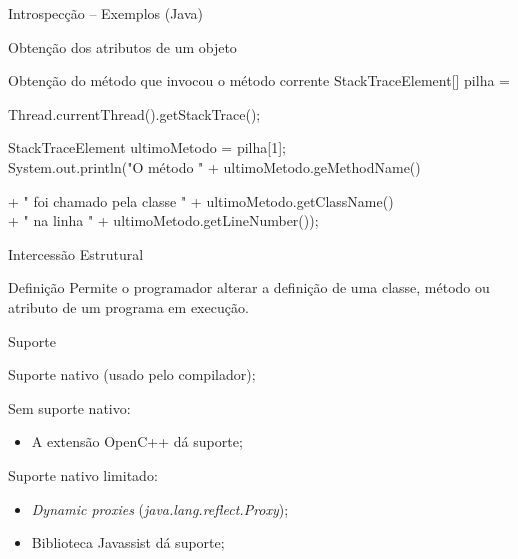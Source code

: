 \documentclass[12pt,t]{beamer}
\begin{document}
 	 \begin{frame}{Introspecção -- Exemplos (Java)}
 	 	\begin{exampleblock}{Obtenção dos atributos de um objeto}
 	 		
 	 	\end{exampleblock}
 	 	\pause
 	 	\begin{exampleblock}{Obtenção do método que invocou o método corrente}
 	 		StackTraceElement[] pilha = \\
 	 		\begin{adjustwidth}{2.5em}{0pt}
 	 			Thread.currentThread().getStackTrace(); \\
			\end{adjustwidth}
 	 		StackTraceElement ultimoMetodo = pilha[1]; \\
 	 		System.out.println("O método " + ultimoMetodo.geMethodName()\\
 	 		\begin{adjustwidth}{2.5em}{0pt}
		    	 + " foi chamado pela classe " + ultimoMetodo.getClassName()\\
				 + " na linha " + ultimoMetodo.getLineNumber()); \\
		    \end{adjustwidth}
 	 	\end{exampleblock}
 	 \end{frame}
 	 \begin{frame}{Intercessão Estrutural}
 	 	\begin{block}{Definição \cite{chiba2000load}}
 	 		Permite o programador alterar a definição de uma classe, método ou atributo de um programa em execução.
 	 	\end{block} 
 	 	\pause
 	 	\begin{block}{Suporte}
 	 		\begin{description}[Smalltalk:]
 	 			\item [Smalltalk:] Suporte nativo (usado pelo compilador);
 	 			\pause
 	 			\item [C++:] Sem suporte nativo:  
 	 				\begin{itemize}
		 	 			\item A extensão OpenC++ \cite{chiba1995metaobject} dá suporte;
		 	 		\end{itemize}
	 	 		\pause
 	 			\item [Java:] Suporte nativo limitado:
	 	 			\begin{itemize}
	 	 				\item \emph{Dynamic proxies} (\emph{java.lang.reflect.Proxy});
	 	 				\item Biblioteca Javassist \cite{chiba2000load} dá suporte;
	 	 			\end{itemize}
 	 		\end{description}
 	 	\end{block}
 	 \end{frame}
\end{document}
